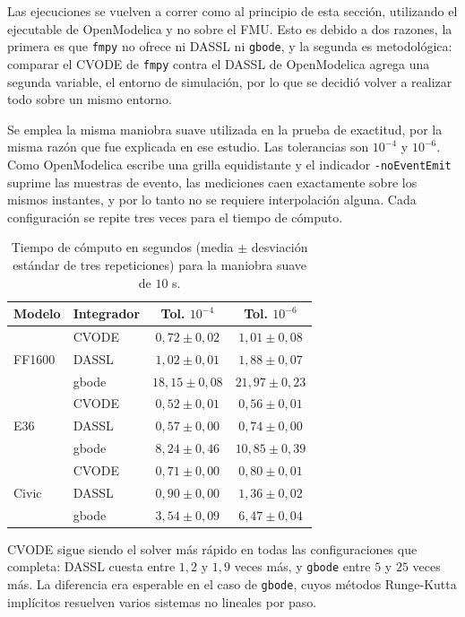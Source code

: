 Las ejecuciones se vuelven a correr como al principio de esta sección, utilizando el ejecutable de OpenModelica y no sobre el FMU. Esto es debido a dos razones, la primera es que \verb|fmpy| no ofrece ni DASSL ni \verb|gbode|, y la segunda es metodológica: comparar el CVODE de \verb|fmpy| contra el DASSL de OpenModelica agrega una segunda variable, el entorno de simulación, por lo que se decidió volver a realizar todo sobre un mismo entorno.


Se emplea la misma maniobra suave utilizada en la prueba de exactitud, por la misma razón que fue explicada en ese estudio. Las tolerancias son $10^{-4}$ y $10^{-6}$. Como OpenModelica escribe una grilla equidistante y el indicador \verb|-noEventEmit| suprime las muestras de evento, las mediciones caen exactamente sobre los mismos instantes, y por lo tanto no se requiere interpolación alguna. Cada configuración se repite tres veces para el tiempo de cómputo.


\begin{table}[H]
\centering
\begin{tabular}{llcc}
	\hline
	Modelo & Integrador & Tol. $10^{-4}$ & Tol. $10^{-6}$ \\
	\hline
	\multirow{3}{*}{FF1600}
	& CVODE & $0{,}72 \pm 0{,}02$ & $1{,}01 \pm 0{,}08$ \\
	& DASSL & $1{,}02 \pm 0{,}01$ & $1{,}88 \pm 0{,}07$ \\
	& gbode & $18{,}15 \pm 0{,}08$ & $21{,}97 \pm 0{,}23$ \\
	\hline
	\multirow{3}{*}{E36}
	& CVODE & $0{,}52 \pm 0{,}01$ & $0{,}56 \pm 0{,}01$ \\
	& DASSL & $0{,}57 \pm 0{,}00$ & $0{,}74 \pm 0{,}00$ \\
	& gbode & $8{,}24 \pm 0{,}46$ & $10{,}85 \pm 0{,}39$ \\
	\hline
	\multirow{3}{*}{Civic}
	& CVODE & $0{,}71 \pm 0{,}00$ & $0{,}80 \pm 0{,}01$ \\
	& DASSL & $0{,}90 \pm 0{,}00$ & $1{,}36 \pm 0{,}02$ \\
	& gbode & $3{,}54 \pm 0{,}09$ & $6{,}47 \pm 0{,}04$ \\
	\hline
\end{tabular}
\caption[Tiempo de cómputo de los tres integradores]{Tiempo de cómputo en segundos (media $\pm$ desviación estándar de tres repeticiones) para la maniobra suave de $10$ s.}
\label{tab:solvers}
\end{table}

CVODE sigue siendo el solver más rápido en todas las configuraciones que completa:  DASSL cuesta entre $1{,}2$ y $1{,}9$ veces más, y \verb|gbode| entre $5$ y $25$ veces más. La diferencia era esperable en el caso de \verb|gbode|, cuyos métodos Runge-Kutta implícitos resuelven varios sistemas no lineales por paso.

